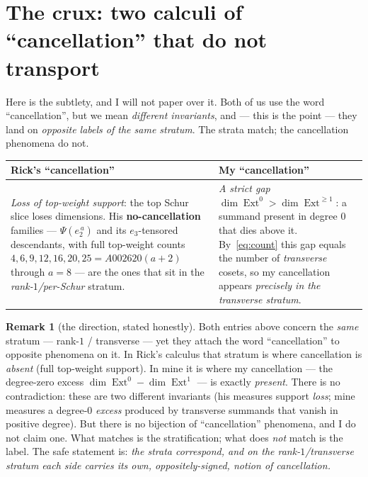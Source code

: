 \documentclass[11pt]{amsart}
\theoremstyle{plain}
\theoremstyle{definition}
\newtheorem{remark}[theorem]{Remark}
\DeclareMathOperator{\Ext}{Ext}
\begin{document}
\section{The crux: two calculi of ``cancellation'' that do not transport}

Here is the subtlety, and I will not paper over it. Both of us use the word
``cancellation'', but we mean \emph{different invariants}, and --- this is the point --- they
land on \emph{opposite labels of the same stratum}. The strata match; the cancellation
phenomena do not.

\begin{center}
\renewcommand{\arraystretch}{1.35}
\begin{tabular}{@{}p{}p{}@{}}
\toprule
\textbf{Rick's ``cancellation''} & \textbf{My ``cancellation''}\\
\midrule
\emph{Loss of top-weight support}: the top Schur slice loses dimensions. His
\textbf{no-cancellation} families --- $\Psi(e_2^{\,a})$ and its $e_3$-tensored descendants,
with full top-weight counts $4,6,9,12,16,20,25 = A002620(a{+}2)$ through $a=8$ --- are the
ones that sit in the \emph{rank-$1$/per-Schur} stratum.
&
\emph{A strict gap $\dim\Ext^0>\dim\Ext^{\ge1}$}: a summand present in degree $0$ that dies
above it. By~\eqref{eq:count} this gap equals the number of \emph{transverse} cosets, so my
cancellation appears \emph{precisely in the transverse stratum}.\\
\bottomrule
\end{tabular}
\end{center}

\begin{remark}[the direction, stated honestly]
Both entries above concern the \emph{same} stratum --- rank-$1$ / transverse --- yet they
attach the word ``cancellation'' to opposite phenomena on it. In Rick's calculus that stratum
is where cancellation is \emph{absent} (full top-weight support). In mine it is where my
cancellation --- the degree-zero excess $\dim\Ext^0-\dim\Ext^1$ --- is exactly \emph{present}.
There is no contradiction: these are two different invariants (his measures support
\emph{loss}; mine measures a degree-$0$ \emph{excess} produced by transverse summands that
vanish in positive degree). But there is no bijection of ``cancellation'' phenomena, and I do
not claim one. What matches is the stratification; what does \emph{not} match is the label.
The safe statement is: \emph{the strata correspond, and on the rank-$1$/transverse stratum
each side carries its own, oppositely-signed, notion of cancellation.}
\end{remark}
\end{document}
